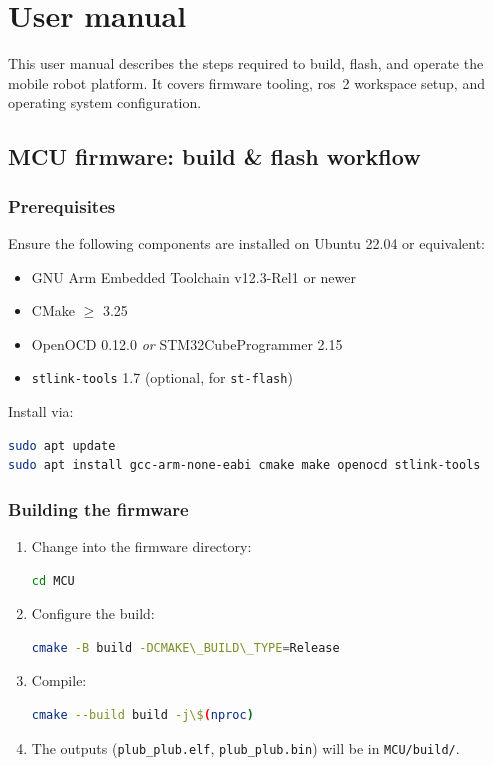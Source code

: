 \chapter{User manual}\label{appendix:user_manual}

This user manual describes the steps required to build, flash, and operate the mobile robot platform. It covers firmware tooling, \gls{ros}~2 workspace setup, and operating system configuration.

\section{MCU firmware: build \& flash workflow}

\subsection{Prerequisites}
Ensure the following components are installed on Ubuntu 22.04 or equivalent:
\begin{itemize}
\item GNU Arm Embedded Toolchain v12.3-Rel1 or newer
\item CMake $\geq$ 3.25
\item OpenOCD 0.12.0 \emph{or} STM32CubeProgrammer 2.15
\item \texttt{stlink-tools} 1.7 (optional, for \texttt{st-flash})
\end{itemize}
Install via:
\begin{lstlisting}[language=bash]
sudo apt update
sudo apt install gcc-arm-none-eabi cmake make openocd stlink-tools
\end{lstlisting}

\subsection{Building the firmware}
\begin{enumerate}
\item Change into the firmware directory:
\begin{lstlisting}[language=bash]
cd MCU
\end{lstlisting}
\item Configure the build:
\begin{lstlisting}[language=bash]
cmake -B build -DCMAKE\_BUILD\_TYPE=Release
\end{lstlisting}
\item Compile:
\begin{lstlisting}[language=bash]
cmake --build build -j\$(nproc)
\end{lstlisting}
\item The outputs (\texttt{plub\_plub.elf}, \texttt{plub\_plub.bin}) will be in \texttt{MCU/build/}.
\end{enumerate}

